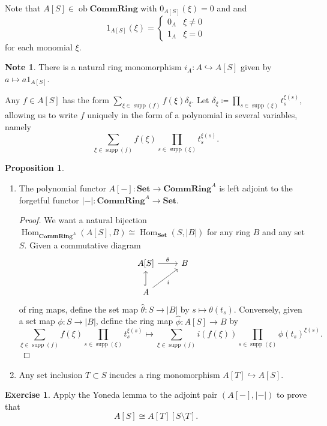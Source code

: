 \documentclass[10pt,letterpaper,cm]{nupset}
\theoremstyle{definition}
\newtheorem{note}[definition]{Note}
\theoremstyle{theorem}
\newtheorem{prop}[definition]{Proposition}
\newtheorem{exercise}[definition]{Exercise}
\theoremstyle{remark}
\newcommand{\1}{\mathbf{1}}
\newcommand{\0}{\vec 0}
\DeclareMathOperator{\ob}{ob}
\DeclareMathOperator{\Hom}{Hom}
\DeclareMathOperator{\supp}{supp}
\begin{document}
Note that $A[S] \in  \ob \mathbf{CommRing}$ with $0_{A[S]}(\xi) =0$ and and $$1_{A[S]}(\xi) = \begin{cases} 0_A & \xi \ne 0 \\ 1_A & \xi =0   \end{cases}$$ for each monomial $\xi$. 

\begin{note}
There is  a natural ring monomorphism $i_A : A \hookrightarrow A[S]$ given by $a \mapsto a1_{A[S]}$.
\end{note}

Any $f\in A[S]$ has the form $\sum_{\xi \in \supp(f)} f(\xi)\delta_{\xi}$. Let $ \delta_{\xi}\coloneqq \prod_{s\in \supp(\xi)}t_s^{\xi(s)}$, allowing us to write $f$ uniquely in the form of a polynomial in several variables, namely
\[
\sum_{\xi \in \supp(f)} f(\xi)\prod_{s\in \supp(\xi)}t_s^{\xi(s)}
.\]

\begin{prop} $ $
\begin{enumerate}
\item The polynomial functor $A[-]: \mathbf{Set} \to \mathbf{CommRing}^A $ is left adjoint to the forgetful functor  $\lvert{-}\rvert: \mathbf{CommRing}^A \to \mathbf{Set}$.
\begin{proof}
We want a natural bijection $\Hom_{\mathbf{CommRing}^A}(A[S], B) \cong \Hom_{\mathbf{Set}}(S, \lvert{B}\rvert)$ for any ring $B$ and any set $S$.  Given a commutative diagram 
\[
\begin{tikzcd}
{A[S]} \arrow[r, "\theta"] & B \\
A \arrow[u, hook] \arrow[ru, "i"'] & 
\end{tikzcd}
\] of ring maps, define the set map $\hat{\theta} : S \to \lvert{B}\rvert$ by $s\mapsto \theta(t_s)$. Conversely, given a set map $\phi : S\to \lvert{B}\rvert$, define the ring map $\hat{\phi} : A[S] \to B$ by $$ \sum_{\xi \in \supp(f)} f(\xi)\prod_{s\in \supp(\xi)}t_s^{\xi(s)}  \mapsto \sum_{\xi \in \supp(f)} i(f(\xi))\prod_{s\in \supp(\xi)}\phi(t_s)^{\xi(s)}  .$$
\end{proof}
\item Any set inclusion $T \subset S$ incudes a ring monomorphism $A[T] \hookrightarrow A[S]$.
\end{enumerate}
\end{prop}

\begin{exercise}
Apply the Yoneda lemma to the adjoint pair $(A[-], \lvert - \rvert)$ to prove that $$A[S]\cong A[T][S\setminus T].$$
\end{exercise}
\end{document}

